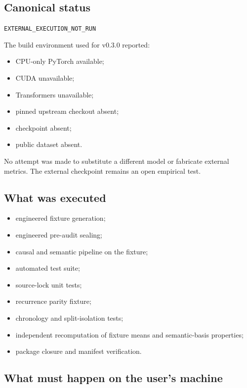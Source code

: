 \documentclass[
  10pt,
]{article}
\providecommand{\tightlist}{%
  \setlength{\itemsep}{0pt}\setlength{\parskip}{0pt}}
\begin{document}
\subsection{Canonical status}\label{canonical-status}

\texttt{EXTERNAL\_EXECUTION\_NOT\_RUN}

The build environment used for v0.3.0 reported:

\begin{itemize}
\tightlist
\item
  CPU-only PyTorch available;
\item
  CUDA unavailable;
\item
  Transformers unavailable;
\item
  pinned upstream checkout absent;
\item
  checkpoint absent;
\item
  public dataset absent.
\end{itemize}

No attempt was made to substitute a different model or fabricate
external metrics. The external checkpoint remains an open empirical
test.

\subsection{What was executed}\label{what-was-executed}

\begin{itemize}
\tightlist
\item
  engineered fixture generation;
\item
  engineered pre-audit sealing;
\item
  causal and semantic pipeline on the fixture;
\item
  automated test suite;
\item
  source-lock unit tests;
\item
  recurrence parity fixture;
\item
  chronology and split-isolation tests;
\item
  independent recomputation of fixture means and semantic-basis
  properties;
\item
  package closure and manifest verification.
\end{itemize}

\subsection{What must happen on the user's
machine}\label{what-must-happen-on-the-users-machine}
\end{document}
